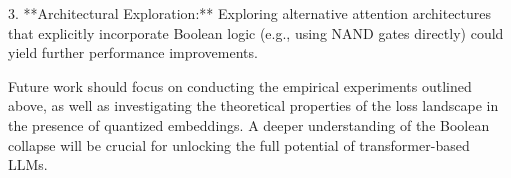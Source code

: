 3.  **Architectural Exploration:**  Exploring alternative attention architectures that explicitly incorporate Boolean logic (e.g., using NAND gates directly) could yield further performance improvements.













Future work should focus on conducting the empirical experiments outlined above, as well as investigating the theoretical properties of the loss landscape in the presence of quantized embeddings.  A deeper understanding of the Boolean collapse will be crucial for unlocking the full potential of transformer-based LLMs.































